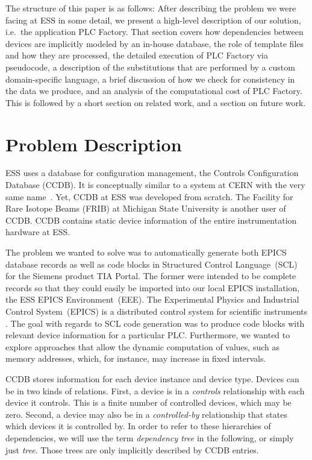 \documentclass[a4paper,
              ]{jacow}
\begin{document}
The structure of this paper is as follows: After describing the problem we were facing at ESS in some detail, we present a high-level description of our solution, i.e.\ the application PLC Factory. That section covers how dependencies between devices are implicitly modeled by an in-house database, the role of template files and how they are processed, the detailed execution of PLC Factory via pseudocode, a description of the substitutions that are performed by a custom domain-specific language, a brief discussion of how we check for consistency in the data we produce, and an analysis of the computational cost of PLC Factory. This is followed by a short section on related work, and a section on future work.



\section{Problem Description}
ESS uses a database for configuration management, the Controls Configuration Database (CCDB). It is conceptually similar to a system at CERN with the very same name~\cite{CCDB-CERN}. Yet, CCDB at ESS was developed from scratch. The Facility for Rare Isotope Beams (FRIB) at Michigan State University is another user of CCDB. CCDB contains static device information of the entire instrumentation hardware at ESS. %

The problem we wanted to solve was to automatically generate both EPICS database records as well as code blocks in Structured Control Language~(SCL) for the Siemens product TIA Portal. The former were intended to be complete records so that they could easily be imported into our local EPICS installation, the ESS EPICS Environment~(EEE). The Experimental Physics and Industrial Control System~(EPICS) is a distributed control system for scientific instruments \cite{EPICS}. The goal with regards to SCL code generation was to produce code blocks with relevant device information for a particular PLC. Furthermore, we wanted to explore approaches that allow the dynamic computation of values, such as memory addresses, which, for instance, may increase in fixed intervals.

CCDB stores information for each device instance and device type. Devices can be in two kinds of relations. First, a device is in a \emph{controls} relationship with each device it controls. This is a finite number of controlled devices, which may be zero. Second, a device may also be in a \emph{controlled-by} relationship that states which devices it is controlled by. In order to refer to these hierarchies of dependencies, we will use the term \emph{dependency tree} in the following, or simply just \emph{tree}. Those trees are only implicitly described by CCDB entries.
\end{document}

